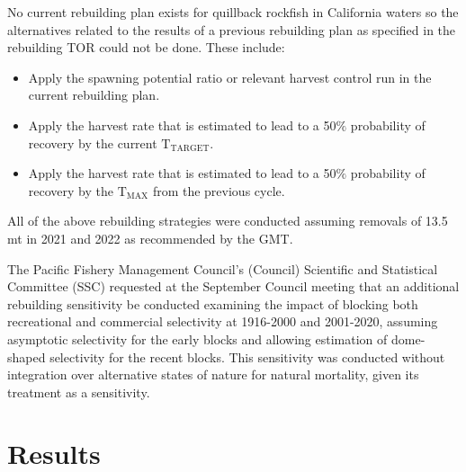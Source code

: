 \documentclass[11pt,
  english,
  letterpaper,
]{article}
\begin{document}
\leavevmode\tagmcend\tagstructend\par


No current rebuilding plan exists for quillback rockfish in California waters so the alternatives related to the results of a previous rebuilding plan as specified in the rebuilding TOR could not be done. These include:

\leavevmode\tagmcend\tagstructend\par

\begin{itemize}
 \item Apply the spawning potential ratio or relevant harvest control run in the current rebuilding plan. 
 \item Apply the harvest rate that is estimated to lead to a 50$\%$ probability of recovery by the current $\text{T}_\text{TARGET}$.
 \item Apply the harvest rate that is estimated to lead to a 50$\%$ probability of recovery by the $\text{T}_\text{MAX}$ from the previous cycle.
\end{itemize}


All of the above rebuilding strategies were conducted assuming removals of 13.5 mt in 2021 and 2022 as recommended by the GMT.

\leavevmode\tagmcend\tagstructend\par


The Pacific Fishery Management Council's (Council) Scientific and Statistical Committee (SSC) requested at the September Council meeting that an additional rebuilding sensitivity be conducted examining the impact of blocking both recreational and commercial selectivity at 1916-2000 and 2001-2020, assuming asymptotic selectivity for the early blocks and allowing estimation of dome-shaped selectivity for the recent blocks. This sensitivity was conducted without integration over alternative states of nature for natural mortality, given its treatment as a sensitivity.

\leavevmode\tagmcend\tagstructend\par


\hypertarget{results}{%
\section{Results}\label{results}}
\end{document}
